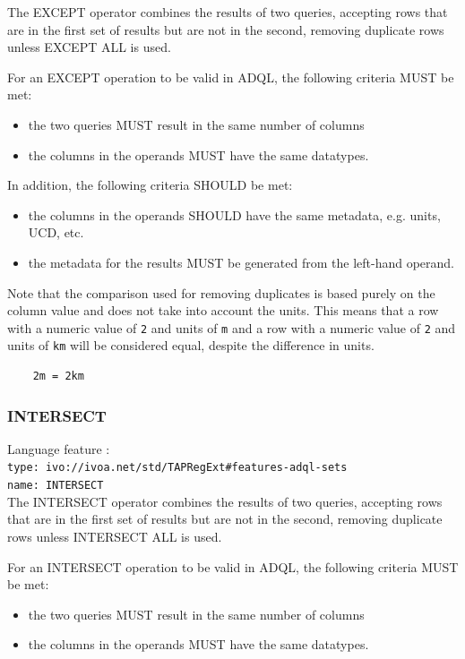 \documentclass[11pt,a4paper]{ivoa}
\begin{document}
The EXCEPT operator combines the results of two queries, accepting rows that are
in the first set of results but are not in the second,
removing duplicate rows unless EXCEPT ALL is used.

For an EXCEPT operation to be valid in ADQL, the following criteria MUST be met:

\begin{itemize}
    \item the two queries MUST result in the same number of columns
    \item the columns in the operands MUST have the same datatypes.
\end{itemize}

In addition, the following criteria SHOULD be met: 
\begin{itemize}
    \item the columns in the operands SHOULD have the same metadata, e.g. units, UCD, etc.
    \item the metadata for the results MUST be generated from the left-hand operand.
\end{itemize}

Note that the comparison used for removing duplicates is based purely on the
column value and does not take into account the units.
This means that a row with a numeric value of \verb:2: and units of \verb:m:
and a row with a numeric value of \verb:2: and units of \verb:km: will be
considered equal, despite the difference in units.
\begin{verbatim}
    2m = 2km
\end{verbatim}

\subsubsection{INTERSECT}
{\footnotesize Language feature :}\\
{\footnotesize \verb|type: ivo://ivoa.net/std/TAPRegExt#features-adql-sets|}\\
{\footnotesize \verb|name: INTERSECT|}\\

The INTERSECT operator combines the results of two queries, accepting rows that are
in the first set of results but are not in the second,
removing duplicate rows unless INTERSECT ALL is used.

For an INTERSECT operation to be valid in ADQL, the following criteria MUST be met:

\begin{itemize}
    \item the two queries MUST result in the same number of columns
    \item the columns in the operands MUST have the same datatypes.
\end{itemize}
\end{document}

